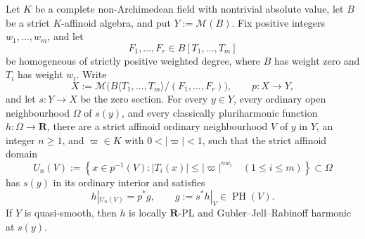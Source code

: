\begin{proposition}
\label{prop:p061-relative-positive-weighted-cone-descent}
Let \(K\) be a complete non-Archimedean field with nontrivial absolute
value, let \(B\) be a strict \(K\)-affinoid algebra, and put
\(Y:=\mathcal M(B)\).  Fix positive integers \(w_1,\ldots,w_m\), and let
\[
 F_1,\ldots,F_r\in B[T_1,\ldots,T_m]
\]
be homogeneous of strictly positive weighted degree, where \(B\) has weight
zero and \(T_i\) has weight \(w_i\).  Write
\[
 X:=\mathcal M\bigl(B\langle T_1,\ldots,T_m\rangle/(F_1,\ldots,F_r)\bigr),
 \qquad p:X\longrightarrow Y,
\]
and let \(s:Y\to X\) be the zero section.  For every \(y\in Y\), every
ordinary open neighbourhood \(\Omega\) of \(s(y)\), and every classically
pluriharmonic function \(h:\Omega\to\mathbf R\), there are a strict
affinoid ordinary neighbourhood \(V\) of \(y\) in \(Y\), an integer
\(n\geq1\), and \(\varpi\in K\) with \(0<|\varpi|<1\), such that the
strict affinoid domain
\[
 U_n(V):=\left\{x\in p^{-1}(V):
 |T_i(x)|\leq |\varpi|^{n w_i}\quad(1\leq i\leq m)\right\}
 \subset\Omega
\]
has \(s(y)\) in its ordinary interior and satisfies
\begin{equation}
\label{eq:p061-relative-weighted-cone-factorization}
 h|_{U_n(V)}=p^*g,
 \qquad g:=s^*h|_V\in\operatorname{PH}(V).
\end{equation}
If \(Y\) is quasi-smooth, then \(h\) is locally \(\mathbf R\)-PL and
Gubler--Jell--Rabinoff harmonic at \(s(y)\).
\end{proposition}
